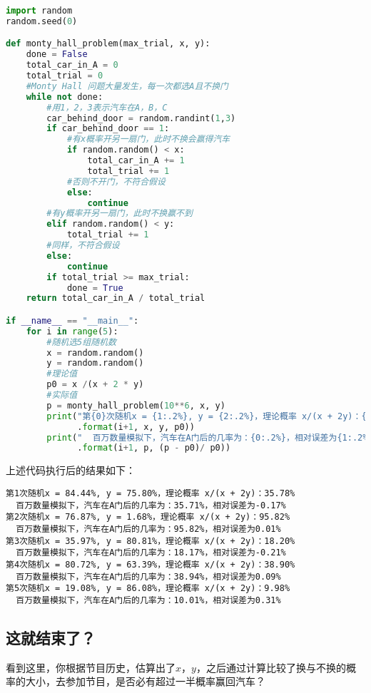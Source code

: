\begin{lstlisting}[language=python]
import random
random.seed(0)

def monty_hall_problem(max_trial, x, y):
    done = False
    total_car_in_A = 0
    total_trial = 0
    #Monty Hall 问题大量发生，每一次都选A且不换门
    while not done:
        #用1，2，3表示汽车在A，B，C
        car_behind_door = random.randint(1,3)
        if car_behind_door == 1:
            #有x概率开另一扇门，此时不换会赢得汽车
            if random.random() < x:
                total_car_in_A += 1
                total_trial += 1
            #否则不开门，不符合假设
            else:
                continue
        #有y概率开另一扇门，此时不换赢不到
        elif random.random() < y:
            total_trial += 1
        #同样，不符合假设
        else:
            continue
        if total_trial >= max_trial:
            done = True
    return total_car_in_A / total_trial

if __name__ == "__main__":
    for i in range(5):
        #随机选5组随机数
        x = random.random()
        y = random.random()
        #理论值
        p0 = x /(x + 2 * y)
        #实际值
        p = monty_hall_problem(10**6, x, y)
        print("第{0}次随机x = {1:.2%}, y = {2:.2%}，理论概率 x/(x + 2y)：{3:.2%}"
              .format(i+1, x, y, p0))
        print("  百万数量模拟下，汽车在A门后的几率为：{0:.2%}，相对误差为{1:.2%}"
              .format(i+1, p, (p - p0)/ p0))
\end{lstlisting}

上述代码执行后的结果如下：

\begin{lstlisting}[language=pythonC]
第1次随机x = 84.44%, y = 75.80%，理论概率 x/(x + 2y)：35.78%
  百万数量模拟下，汽车在A门后的几率为：35.71%，相对误差为-0.17%
第2次随机x = 76.87%, y = 1.68%，理论概率 x/(x + 2y)：95.82%
  百万数量模拟下，汽车在A门后的几率为：95.82%，相对误差为0.01%
第3次随机x = 35.97%, y = 80.81%，理论概率 x/(x + 2y)：18.20%
  百万数量模拟下，汽车在A门后的几率为：18.17%，相对误差为-0.21%
第4次随机x = 80.72%, y = 63.39%，理论概率 x/(x + 2y)：38.90%
  百万数量模拟下，汽车在A门后的几率为：38.94%，相对误差为0.09%
第5次随机x = 19.08%, y = 86.08%，理论概率 x/(x + 2y)：9.98%
  百万数量模拟下，汽车在A门后的几率为：10.01%，相对误差为0.31%
\end{lstlisting}

\subsection{这就结束了？}
看到这里，你根据节目历史，估算出了$x$，$y$，之后通过计算比较了换与不换的概率的大小，去参加节目，是否必有超过一半概率赢回汽车？


